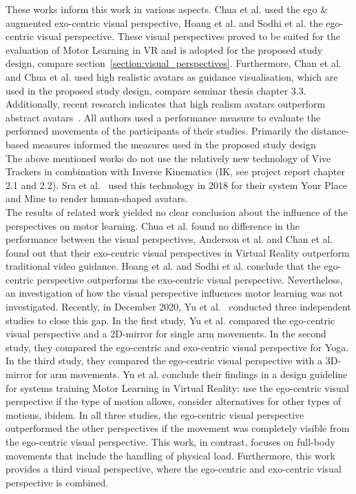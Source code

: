 These works inform this work in various aspects. Chua et al. used the ego \& augmented exo-centric visual perspective, Hoang et al. and Sodhi et al. the ego-centric visual perspective. These visual perspectives proved to be suited for the evaluation of Motor Learning in VR and is adopted for the proposed study design, compare section~\ref{section:visual_perspectives}. Furthermore, Chan et al. and Chua et al. used high realistic avatars as guidance visualisation, which are used in the proposed study design, compare seminar thesis chapter 3.3. Additionally, recent research indicates that high realism avatars outperform abstract avatars~\cite{max,perspectivematters}. All authors used a performance measure to evaluate the performed movements of the participants of their studies. Primarily the distance-based measures informed the measures used in the proposed study design\\%
The above mentioned works do not use the relatively new technology of Vive Trackers in combination with Inverse Kinematics (IK, see project report chapter 2.1 and 2.2). Sra et al.~\cite{samesetup} used this technology in 2018 for their system Your Place and Mine to render human-shaped avatars.\\
The results of related work yielded no clear conclusion about the influence of the perspectives on motor learning. Chua et al. found no difference in the performance between the visual perspectives, Anderson et al. and Chan et al. found out that their exo-centric visual perspectives in Virtual Reality outperform traditional video guidance. Hoang et al. and Sodhi et al. conclude that the ego-centric perspective outperforms the exo-centric visual perspective. Nevertheless, an investigation of how the visual perspective influences motor learning was not investigated. Recently, in December 2020, Yu et al.~\cite{perspectivematters} conducted three independent studies to close this gap. In the first study, Yu et al. compared the ego-centric visual perspective and a 2D-mirror for single arm movements. In the second study, they compared the ego-centric and exo-centric visual perspective for Yoga. In the third study, they compared the ego-centric visual perspective with a 3D-mirror for arm movements. Yu et al. conclude their findings in a design guideline for systems training Motor Learning in Virtual Reality: use the ego-centric visual perspective if the type of motion allows, consider alternatives for other types of motions, ibidem. In all three studies, the ego-centric visual perspective outperformed the other perspectives if the movement was completely visible from the ego-centric visual perspective. This work, in contrast, focuses on full-body movements that include the handling of physical load. Furthermore, this work provides a third visual perspective, where the ego-centric and exo-centric visual perspective is combined.

